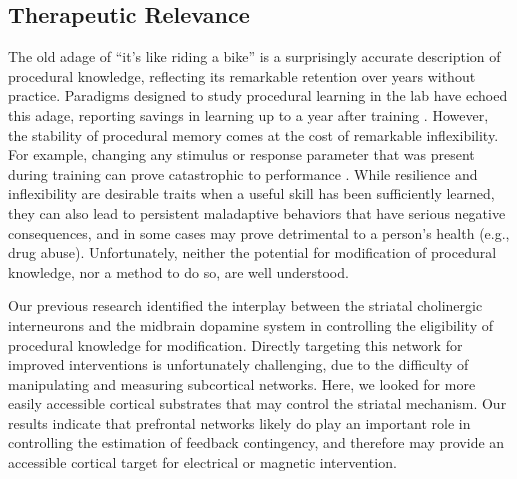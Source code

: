 \documentclass[man,apacite,draftfirst]{apa6}
\begin{document}
\subsection*{Therapeutic Relevance}
The old adage of ``it's like riding a bike'' is a surprisingly accurate
description of procedural knowledge, reflecting its remarkable retention over
years without practice. Paradigms designed to study procedural learning in the
lab have echoed this adage, reporting savings in learning up to a year after
training \cite{Romano2010, turner_long-term_2012}. However, the stability of
procedural memory comes at the cost of remarkable inflexibility. For example,
changing any stimulus or response parameter that was present during training can
prove catastrophic to performance \cite{Rozanov_2010, Dienes_1997}. While
resilience and inflexibility are desirable traits when a useful skill has been
sufficiently learned, they can also lead to persistent maladaptive behaviors
that have serious negative consequences, and in some cases may prove detrimental
to a person's health (e.g., drug abuse). Unfortunately, neither the potential
for modification of procedural knowledge, nor a method to do so, are well
understood.

Our previous research identified the interplay between the striatal cholinergic
interneurons and the midbrain dopamine system in controlling the eligibility of
procedural knowledge for modification. Directly targeting this network for
improved interventions is unfortunately challenging, due to the difficulty of
manipulating and measuring subcortical networks. Here, we looked for more easily
accessible cortical substrates that may control the striatal mechanism. Our
results indicate that prefrontal networks likely do play an important role in
controlling the estimation of feedback contingency, and therefore may provide an
accessible cortical target for electrical or magnetic intervention.


\end{document}
